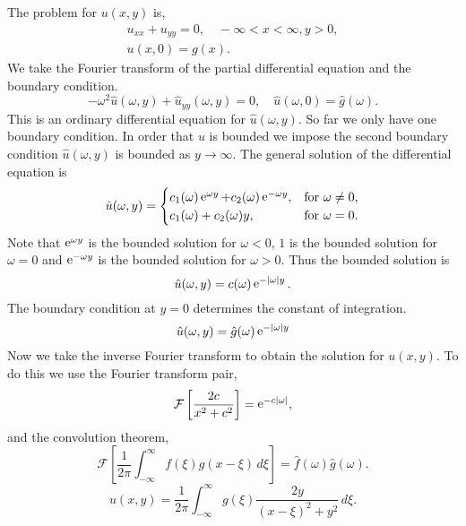 {%
\begin{Solution}
  The problem for $u(x,y)$ is,
  \begin{gather*}
    u_{x x} + u_{y y} = 0, \quad -\infty < x < \infty, y > 0, \\
    u(x,0) = g(x).
  \end{gather*}
  We take the Fourier transform of the partial differential equation and the
  boundary condition.
  \[
  -\omega^2 \hat{u}(\omega, y) + \hat{u}_{y y}(\omega, y) = 0, \quad
  \hat{u}(\omega, 0) = \hat{g}(\omega).
  \]
  This is an ordinary differential equation for $\hat{u}(\omega,y)$.  So 
  far we only have one boundary condition.  In order that $u$ is bounded
  we impose the second boundary condition $\hat{u}(\omega, y)$ is bounded as
  $y \to \infty$.  The general solution of the differential equation is
  \[
  \hat{u}(\omega,y) = \begin{cases}
    c_1(\omega) \mathop{\mathrm{e}}\nolimits^{\omega y} + c_2(\omega) \mathop{\mathrm{e}}\nolimits^{- \omega y}, 
    &\mathrm{for}\ \omega \neq 0, \\
    c_1(\omega) + c_2(\omega) y,
    &\mathrm{for}\ \omega = 0. 
  \end{cases}
  \]
  Note that $\mathop{\mathrm{e}}\nolimits^{\omega y}$ is the bounded solution for $\omega < 0$, $1$ is
  the bounded solution for $\omega = 0$ and $\mathop{\mathrm{e}}\nolimits^{- \omega y}$ is the 
  bounded solution for $\omega > 0$.  Thus the bounded solution is
  \[
  \hat{u}(\omega,y) = c(\omega) \mathop{\mathrm{e}}\nolimits^{-|\omega| y}.
  \]
  The boundary condition at $y = 0$ determines the constant of integration.
  \[
  \hat{u}(\omega,y) = \hat{g}(\omega) \mathop{\mathrm{e}}\nolimits^{-|\omega| y}
  \]
  Now we take the inverse Fourier transform to obtain the solution for 
  $u(x,y)$.  To do this we use the Fourier transform pair,
  \[
  \mathcal{F} \left[ \frac{2 c}{x^2 + c^2} \right] = \mathop{\mathrm{e}}\nolimits^{-c |\omega|},
  \]
  and the convolution theorem,
  \[
  \mathcal{F} \left[ \frac{1}{2\pi} \int_{-\infty}^\infty f(\xi) g(x-\xi) \,d\xi \right]
  = \hat{f}(\omega) \hat{g}(\omega).
  \]
  \[
  \boxed{
    u(x,y) = \frac{1}{2\pi} \int_{-\infty}^\infty g(\xi) \frac{2 y}{ (x-\xi)^2 + y^2}\,d\xi.
    }
  \]
\end{Solution}



}
